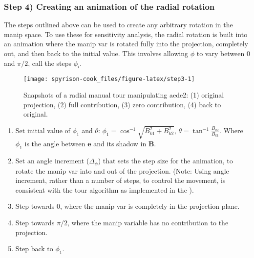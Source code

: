 \hypertarget{step-4-creating-an-animation-of-the-radial-rotation}{%
\subsubsection{Step 4) Creating an animation of the radial
rotation}\label{step-4-creating-an-animation-of-the-radial-rotation}}

The steps outlined above can be used to create any arbitrary rotation in
the manip space. To use these for sensitivity analysis, the radial
rotation is built into an animation where the manip var is rotated fully
into the projection, completely out, and then back to the initial value.
This involves allowing \(\phi\) to vary between \(0\) and \(\pi/2\),
call the steps \(\phi_i\).

\begin{Schunk}
\begin{figure}

{\centering \texttt{[image: spyrison-cook\_files/figure-latex/step3-1]} 

}

\caption[Snapshots of a radial manual tour manipulating aede2]{Snapshots of a radial manual tour manipulating aede2: (1) original projection, (2) full contribution, (3) zero contribution, (4) back to original. }\label{fig:step3}
\end{figure}
\end{Schunk}

\begin{enumerate}
\def\labelenumi{\arabic{enumi}.}
\tightlist
\item
  Set initial value of \(\phi_1\) and \(\theta\):
  \(\phi_1 = \cos^{-1}{\sqrt{B_{k1}^2+B_{k2}^2}}\),
  \(\theta = \tan^{-1}\frac{B_{k2}}{B_{k1}}\). Where \(\phi_1\) is the
  angle between \(\textbf{e}\) and its shadow in \(\textbf{B}\).
\item
  Set an angle increment (\(\Delta_\phi\)) that sets the step size for
  the animation, to rotate the manip var into and out of the projection.
  (Note: Using angle increment, rather than a number of steps, to
  control the movement, is consistent with the tour algorithm as
  implemented in the ).
\item
  Step towards \(0\), where the manip var is completely in the
  projection plane.
\item
  Step towards \(\pi/2\), where the manip variable has no contribution
  to the projection.
\item
  Step back to \(\phi_1\).
\end{enumerate}

